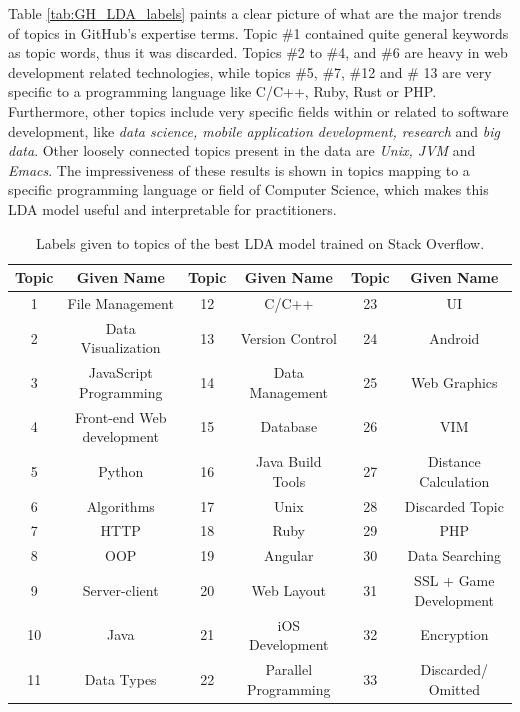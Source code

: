             Table \ref{tab:GH_LDA_labels} paints a clear picture of what are the major trends of topics in GitHub's expertise terms. Topic \#1 contained quite general keywords as topic words, thus it was discarded. Topics \#2 to \#4, and \#6 are heavy in web development related technologies, while topics \#5, \#7, \#12 and \# 13 are very specific to a programming language like C/C++, Ruby, Rust or PHP. Furthermore, other topics include very specific fields within or related to software development, like \emph{data science, mobile application development, research} and \emph{big data}. Other loosely connected topics present in the data are \emph{Unix, JVM} and \emph{Emacs}. The impressiveness of these results is shown in topics mapping to a specific programming language or field of Computer Science, which makes this LDA model useful and interpretable for practitioners.  
            
            \begin{table}
              \centering
              \caption{Labels given to topics of the best LDA model trained on Stack Overflow.}\label{tab:SO_LDA_labels}
                \vspace{6pt} %
               \resizebox{\textwidth}{!} {
              \begin{tabular}{|c c|c c|c c|}
                \hline
                Topic & Given Name & Topic & Given Name & Topic & Given Name \\
                \hline
                1 & File Management & 12 & C/C++ & 23 & UI \\
                2 & Data Visualization & 13 & Version Control & 24 & Android \\
                3 & JavaScript Programming & 14 & Data Management & 25 & Web Graphics \\
                4 & Front-end Web development & 15 & Database & 26 & VIM \\
                5 & Python & 16 & Java Build Tools & 27 & Distance Calculation \\
                6 & Algorithms & 17 & Unix & 28 & Discarded Topic \\
                7 & HTTP & 18 & Ruby & 29 & PHP \\
                8 & OOP & 19 & Angular & 30 & Data Searching \\
                9 & Server-client & 20 & Web Layout & 31 & SSL + Game Development \\
                10 & Java & 21 & iOS Development & 32 & Encryption \\
                11 & Data Types & 22 & Parallel Programming & 33 & Discarded/ Omitted \\
                \hline
              \end{tabular}}
            \end{table}
            
